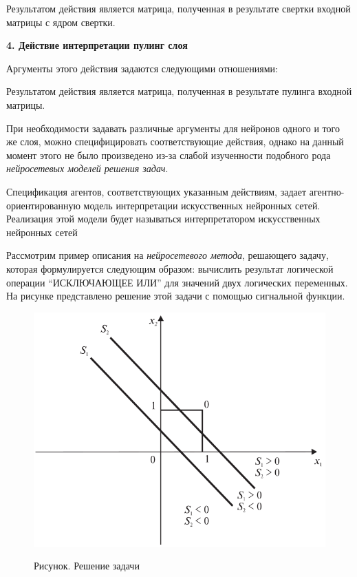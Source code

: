 Результатом действия является матрица, полученная в результате свертки входной матрицы с ядром свертки.


\textbf{4. Действие интерпретации пулинг слоя}

Аргументы этого действия задаются следующими отношениями:
\begin{SCn}



\end{SCn}

Результатом действия является матрица, полученная в результате пулинга входной матрицы.

При необходимости задавать различные аргументы для нейронов одного и того же слоя, можно специфицировать соответствующие действия, однако на данный момент этого не было произведено из-за слабой изученности подобного рода \textit{нейросетевых моделей решения задач}.

Спецификация агентов, соответствующих указанным действиям, задает агентно-ориентированную модель интерпретации искусственных нейронных сетей. Реализация этой модели будет называться интерпретатором искусственных нейронных сетей

Рассмотрим пример описания на \textit{нейросетевого метода}, решающего задачу, которая формулируется следующим образом: вычислить результат логической операции ``ИСКЛЮЧАЮЩЕЕ ИЛИ'' для значений двух логических переменных. На рисунке \textit{} представлено решение этой задачи с помощью сигнальной функции.

\begin{figure}
	\caption{Рисунок. Решение задачи }
	\includegraphics[width=0.5\linewidth]{author/part3/figures/strong_or_graphic.png}
	\label{fig:strong_or_graphic}
\end{figure}


